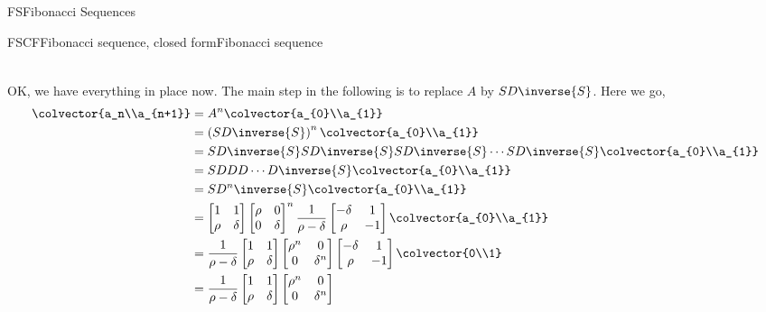 \begin{subsect}{FS}{Fibonacci Sequences}
\begin{example}{FSCF}{Fibonacci sequence, closed form}{Fibonacci sequence}
\begin{para}
\begin{align*}
\end{align*}
\end{para}
%
\begin{para}OK, we have everything in place now.  The main step in the following is to replace $A$ by $SD\inverse{S}$. Here we go,
%
\begin{align*}
\colvector{a_n\\a_{n+1}}
&=A^n\colvector{a_{0}\\a_{1}}\\
&=\left(SD\inverse{S}\right)^n\colvector{a_{0}\\a_{1}}\\
&=SD\inverse{S}SD\inverse{S}SD\inverse{S}\cdots SD\inverse{S}\colvector{a_{0}\\a_{1}}\\
&=SDDD\cdots D\inverse{S}\colvector{a_{0}\\a_{1}}\\
&=SD^n\inverse{S}\colvector{a_{0}\\a_{1}}\\
&=
\begin{bmatrix}1&1\\\rho&\delta\end{bmatrix}
\begin{bmatrix}\rho&0\\0&\delta\end{bmatrix}^n
\frac{1}{\rho-\delta}\begin{bmatrix}-\delta&1\\\rho&-1\end{bmatrix}
\colvector{a_{0}\\a_{1}}\\
&=
\frac{1}{\rho-\delta}
\begin{bmatrix}1&1\\\rho&\delta\end{bmatrix}
\begin{bmatrix}\rho^n&0\\0&\delta^n\end{bmatrix}
\begin{bmatrix}-\delta&1\\\rho&-1\end{bmatrix}
\colvector{0\\1}\\
&=
\frac{1}{\rho-\delta}
\begin{bmatrix}1&1\\\rho&\delta\end{bmatrix}
\begin{bmatrix}\rho^n&0\\0&\delta^n\end{bmatrix}

\end{align*}
\end{para}
\end{example}
\end{subsect}
